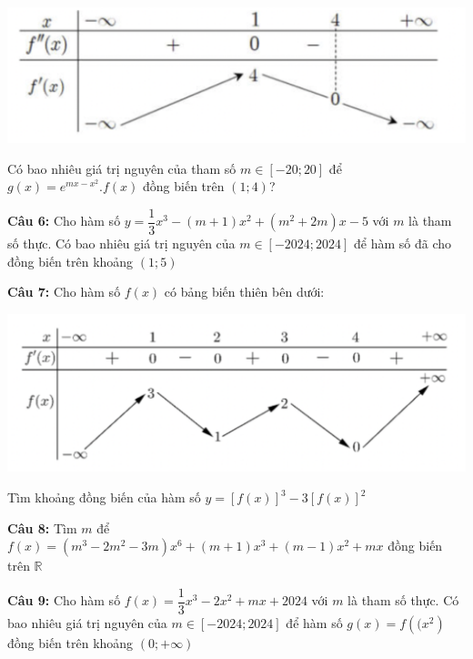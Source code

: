 \documentclass[12pt, a4paper]{article}
\begin{document}
\vspace{-0.6cm}	
	
			\begin{center}
				\includegraphics[scale=0.4]{../images/dondieu_cau5.png}
			\end{center}		
			
\vspace{-0.7cm}
		
		Có bao nhiêu giá trị nguyên của tham số $m \in [-20;20]$ để $g(x)=e^{mx-x^2}.f(x)$ đồng biến trên $(1;4)$?
			
		\textbf{Câu 6: } Cho hàm số $y=\dfrac{1}{3}x^3-(m+1)x^2+(m^2+2m)x-5$ với $m$ là tham số thực. Có bao nhiêu giá trị nguyên của $m\in [-2024;2024]$ để hàm số đã cho đồng biến trên khoảng $(1;5)$
		
		\textbf{Câu 7: } Cho hàm số $f(x)$ có bảng biến thiên bên dưới:
		
\vspace{-0.75cm}

			\begin{center}
				\includegraphics[scale=0.54]{../images/dondieu_cau7.png}
			\end{center}
			
\vspace{-0.8cm}			
			
		Tìm khoảng đồng biến của hàm số $y=[f(x)]^3-3[f(x)]^2$ 

\pagebreak

		\textbf{Câu 8: } Tìm $m$ để $f(x)=(m^3-2m^2-3m)x^6+(m+1)x^3+(m-1)x^2+mx$ đồng biến trên $\mathbb{R}$

		\textbf{Câu 9: } Cho hàm số $f(x)=\dfrac{1}{3}x^3-2x^2+mx+2024$ với $m$ là tham số thực. Có bao nhiêu giá trị nguyên của $m \in [-2024;2024]$ để hàm số $g(x)=f\left((x^2\right)$ đồng biến trên khoảng $(0;+\infty)$
\end{document}
